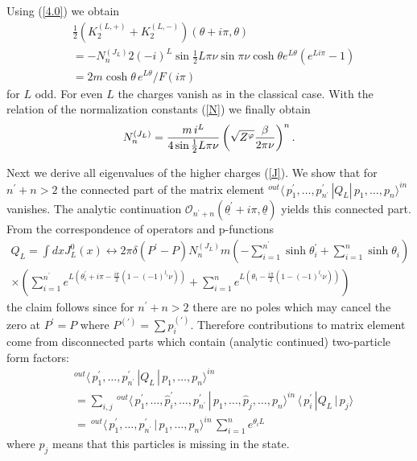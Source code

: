 \documentclass[a4paper,a4paper]{article}
\begin{document}
Using (\ref{4.0}) we obtain 
\begin{align*}
& \tfrac{1}{2}\left( K_{2}^{(L,+)}+K_{2}^{(L,-)}\right) (\theta +i\pi
,\theta ) \\
& =-N_{n}^{(J_{L})}2\left( -i\right) ^{L}\sin \tfrac{1}{2}L\pi \nu \sin \pi
\nu \cosh \theta e^{L\theta }\left( e^{Li\pi }-1\right) \\
& =2m\cosh \theta \,e^{L\theta }/F(i\pi )
\end{align*}
for $L$ odd. For even $L$ the charges vanish as in the classical case. With
the relation of the normalization constants (\ref{N}) we finally obtain 
\begin{equation}
N_{n}^{(J_{L})}=\frac{m\,i^{L}}{4\sin \tfrac{1}{2}L\pi \nu }\left( \sqrt{%
Z^{\varphi }}\frac{\beta }{2\pi \nu }\right) ^{n}.  \label{Nj}
\end{equation}

Next we derive all eigenvalues of the higher charges (\ref{J}). We show that
for $n^{\prime }+n>2$ the connected part of the matrix element $%
^{out}\langle \,p_{1}^{\prime },\dots ,p_{n^{\prime }}^{\prime
}\,|Q_{L}|\,p_{1},\dots ,p_{n}\rangle ^{in}$ vanishes. The analytic
continuation $\mathcal{O}_{n^{\prime }+n}(\underline{\theta ^{\prime }}+i\pi
,\underline{\theta })$ yields this connected part. From the correspondence
of operators and p-functions 
\begin{multline*}
Q_{L}=\int dxJ_{L}^{0}(x)\leftrightarrow 2\pi \delta (P^{\prime
}-P)N_{n}^{(J_{L})}m\left( -\sum_{i=1}^{n^{\prime }}\sinh \theta
_{i}^{\prime }+\sum_{i=1}^{n}\sinh \theta _{i}\right) \\
\times \left( \sum_{i=1}^{n^{\prime }}e^{L\left( \theta _{i}^{\prime }+i\pi -%
\frac{i\pi }{2}(1-(-1)^{l_{i}}\nu )\right) }+\sum_{i=1}^{n}e^{L\left( \theta
_{i}-\frac{i\pi }{2}(1-(-1)^{l_{i}}\nu )\right) }\right)
\end{multline*}
the claim follows since for $n^{\prime }+n>2$ there are no poles which may
cancel the zero at $P^{\prime }=P$ where $P^{(\prime )}=\sum p_{i}^{(\prime
)}$. Therefore contributions to matrix element come from disconnected parts
which contain (analytic continued) two-particle form factors: 
\begin{align*}
& ^{out}\langle \,p_{1}^{\prime },\dots ,p_{n^{\prime }}^{\prime
}\,|Q_{L}\,|\,p_{1},\dots ,p_{n}\rangle ^{in} \\
& =\sum_{i,j}\,^{out}\langle \,p_{1}^{\prime },\dots ,\hat{p}_{i}^{\prime
},\dots ,p_{n^{\prime }}^{\prime }\,|\,p_{1},\dots ,\hat{p}_{j},\dots
,p_{n}\rangle ^{in}\,\langle \,p_{i}^{\prime }\,|Q_{L}\,|\,p_{j}\rangle \\
& =\,^{out}\langle \,p_{1}^{\prime },\dots ,p_{n^{\prime }}^{\prime
}\,|\,p_{1},\dots ,p_{n}\rangle ^{in}\,\sum_{i=1}^{n}e^{\theta _{i}L}
\end{align*}
where $\hat{p}_{j}$ means that this particles is missing in the state.
\end{document}
